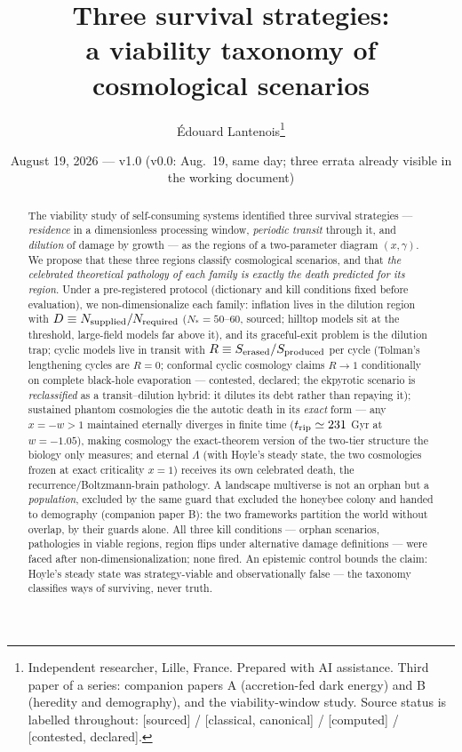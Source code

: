 \documentclass[11pt]{article}
\title{\textbf{Three survival strategies:\\ a viability taxonomy of cosmological scenarios}}
\author{\'Edouard Lantenois\thanks{Independent researcher, Lille, France. Prepared with AI assistance. Third paper of a series: companion papers A (accretion-fed dark energy) and B (heredity and demography), and the viability-window study. Source status is labelled throughout: [sourced] / [classical, canonical] / [computed] / [contested, declared].}}
\date{August 19, 2026 --- v1.0 (v0.0: Aug.\ 19, same day; three errata already visible in the working document)}
\begin{document}
\maketitle
\begin{abstract}
The viability study of self-consuming systems identified three survival strategies ---
\emph{residence} in a dimensionless processing window, \emph{periodic transit} through it, and
\emph{dilution} of damage by growth --- as the regions of a two-parameter diagram $(x, \gamma)$.
We propose that these three regions classify cosmological scenarios, and that \emph{the
celebrated theoretical pathology of each family is exactly the death predicted for its region}.
Under a pre-registered protocol (dictionary and kill conditions fixed before evaluation), we
non-dimensionalize each family: inflation lives in the dilution region with
$D \equiv N_{\rm supplied}/N_{\rm required}$ ($N_* = 50$--$60$, sourced; hilltop models sit at
the threshold, large-field models far above it), and its graceful-exit problem is the dilution
trap; cyclic models live in transit with $R \equiv S_{\rm erased}/S_{\rm produced}$ per cycle
(Tolman's lengthening cycles are $R = 0$; conformal cyclic cosmology claims $R \to 1$
conditionally on complete black-hole evaporation --- contested, declared; the ekpyrotic scenario
is \emph{reclassified} as a transit--dilution hybrid: it dilutes its debt rather than repaying
it); sustained phantom cosmologies die the autotic death in its \emph{exact} form --- any
$x = -w > 1$ maintained eternally diverges in finite time ($t_{\rm rip} \simeq 231$ Gyr at
$w = -1.05$), making cosmology the exact-theorem version of the two-tier structure the biology
only measures; and eternal $\Lambda$ (with Hoyle's steady state, the two cosmologies frozen at
exact criticality $x = 1$) receives its own celebrated death, the recurrence/Boltzmann-brain
pathology. A landscape multiverse is not an orphan but a \emph{population}, excluded by the same
guard that excluded the honeybee colony and handed to demography (companion paper B): the two
frameworks partition the world without overlap, by their guards alone. All three kill conditions
--- orphan scenarios, pathologies in viable regions, region flips under alternative damage
definitions --- were faced after non-dimensionalization; none fired. An epistemic control bounds
the claim: Hoyle's steady state was strategy-viable and observationally false --- the taxonomy
classifies ways of surviving, never truth.
\end{abstract}
\end{document}

